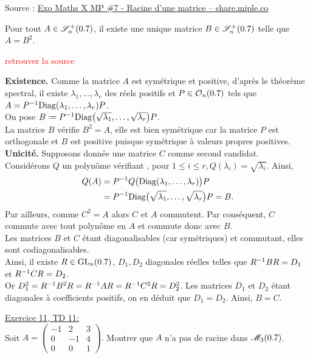 Source : \href{https://share.miple.co/content/CtwFAB5leFp4M}{Exo Maths X MP \#7 - Racine d'une matrice -- \textsf{share.miple.co}}
\begin{prop}{}
    Pour tout $A \in \mathscr{S}_n^+(0.7)$, il existe une unique matrice $B \in \mathscr{S}_n^+(0.7)$ telle que $A = B^2$. 
\end{prop}
\textcolor{red}{retrouver la source}
\begin{preuve}
    \textbf{Existence.} Comme la matrice $A$ est symétrique et positive, d'après le théorème spectral, il existe $\lambda_1, \dots, \lambda_r$ des réels positifs et $P \in \mathcal{O}_n(0.7)$ tels que $A = P^{-1} \mathrm{Diag}(\lambda_1, \dots, \lambda_r) P$. \\
    On pose $B \defeq \Inv{P} \Diag \big(\sqrt{\lambda_1}, \dots, \sqrt{\lambda_r} \big) P$. \\
    La matrice $B$ vérifie $B^2 = A$, elle est bien symétrique car la matrice $P$ est orthogonale et $B$ est positive puisque symétrique à valeurs propres positives. \\
    \textbf{Unicité.} Supposons donnée une matrice $C$ comme second candidat. \\
    Considérons $Q$ un polynôme vérifiant   , pour $1 \leqslant i \leqslant r, Q(\lambda_i) = \sqrt{\lambda_i}$. Ainsi, 
    \begin{align*}
        Q(A) &= P^{-1} Q\big( \mathrm{Diag}(\lambda_1, \dots, \lambda_r) \big) P \\
        &= P^{-1} \mathrm{Diag} \big(\sqrt{\lambda_1}, \dots, \sqrt{\lambda_r} \big) P = B.
    \end{align*}
    Par ailleurs, comme $C^2 = A$ alors $C$ et $A$ commutent. Par conséquent, $C$ commute avec tout polynôme en $A$ et commute donc avec $B$. \\
    Les matrices $B$ et $C$ étant diagonalisables (car symétriques) et commutant, elles sont codiagonalisables. \\
    Ainsi, il existe $R \in \mathrm{GL}_n(0.7)$, $D_1, D_2$ diagonales réelles telles que $R^{-1}BR = D_1$ et $R^{-1}CR = D_2$. \\
    Or $D_1^2 = R^{-1} B^2 R = R^{-1} A R = R^{-1} C^2 R = D_2^2$. Les matrices $D_1$ et $D_2$ étant diagonales à coefficients positifs, on en déduit que $D_1 = D_2$. Ainsi, $B = C$.
\end{preuve}

\begin{exercice}
    \underline{Exercice 11, TD 11:}\\
    Soit $A = 
    \begin{pmatrix}
        -1 & 2 & 3 \\
        0 & - 1 & 4 \\
        0 & 0 & 1
    \end{pmatrix}. 
    $ Montrer que $A$ n'a pas de racine dans $\mathscr{M}_3(0.7)$. 
\end{exercice}
